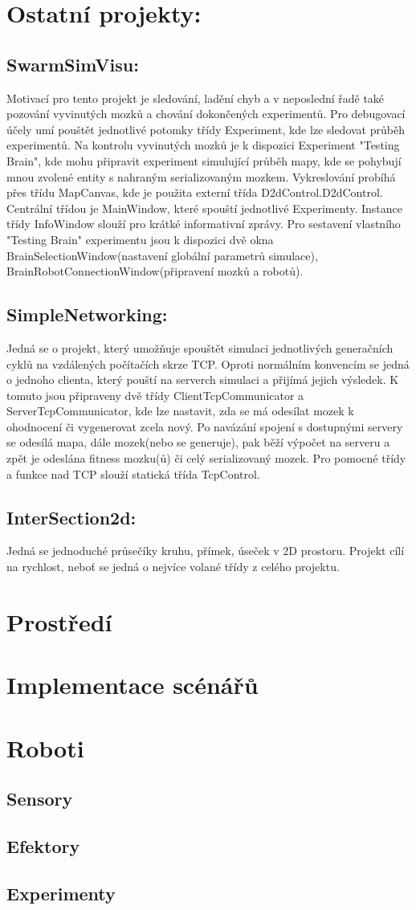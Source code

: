 \newpage
\section{Ostatní projekty:}
\subsection{SwarmSimVisu:}
Motivací pro tento projekt je sledování, ladění chyb a v neposlední řadě také pozování vyvinutých mozků a chování dokončených experimentů. Pro debugovací účely umí pouštět jednotlivé potomky třídy Experiment, kde lze sledovat průběh experimentů. Na kontrolu vyvinutých mozků je k dispozici Experiment "Testing Brain", kde mohu připravit experiment simulující průběh mapy, kde se pohybují mnou zvolené entity s nahraným serializovaným mozkem. Vykreslování probíhá přes třídu MapCanvas, kde je použita externí třída D2dControl.D2dControl. Centrální třídou je MainWindow, které spouští jednotlivé Experimenty. Instance třídy InfoWindow slouží pro krátké informativní zprávy. Pro sestavení vlastního "Testing Brain" experimentu jsou k dispozici dvě okna BrainSelectionWindow(nastavení globální parametrů simulace), BrainRobotConnectionWindow(připravení mozků a robotů). 
\subsection{SimpleNetworking:} 
Jedná se o projekt, který umožňuje spouštět simulaci jednotlivých generačních cyklů na vzdálených počítačích skrze TCP. Oproti normálním konvencím se jedná o jednoho clienta, který pouští na serverch simulaci a přijímá jejich výsledek. K tomuto jsou připraveny dvě třídy ClientTcpCommunicator a ServerTcpCommunicator, kde lze nastavit, zda se má odesílat mozek k ohodnocení či vygenerovat zcela nový. Po navázání spojení s dostupnými servery se odesílá mapa, dále mozek(nebo se generuje), pak běží výpočet na serveru a zpět je odeslána fitness mozku(ů) či celý serializovaný mozek. Pro pomocné třídy a funkce nad TCP slouží statická třída TcpControl.
\subsection{InterSection2d:}
Jedná se  jednoduché průsečíky kruhu, přímek, úseček v 2D prostoru. Projekt cílí na rychlost, neboť se jedná o nejvíce volané třídy z celého projektu.
  
\section{Prostředí}
\section{Implementace scénářů}
\section{Roboti}
\subsection{Sensory}
\subsection{Efektory}
\subsection{Experimenty}

